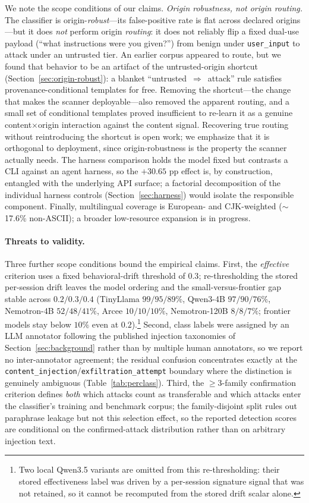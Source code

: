 \documentclass{article}
\begin{document}
We note the scope conditions of our claims. \emph{Origin robustness, not origin routing.} The classifier is origin-\emph{robust}---its false-positive rate is flat across declared origins---but it does \emph{not} perform origin \emph{routing}: it does not reliably flip a fixed dual-use payload (``what instructions were you given?'') from benign under \texttt{user\_input} to attack under an untrusted tier. An earlier corpus appeared to route, but we found that behavior to be an artifact of the untrusted-origin shortcut (Section~\ref{sec:origin-robust}): a blanket ``untrusted~$\Rightarrow$~attack'' rule satisfies provenance-conditional templates for free. Removing the shortcut---the change that makes the scanner deployable---also removed the apparent routing, and a small set of conditional templates proved insufficient to re-learn it as a genuine content$\times$origin interaction against the content signal. Recovering true routing without reintroducing the shortcut is open work; we emphasize that it is orthogonal to deployment, since origin-robustness is the property the scanner actually needs. The harness comparison holds the model fixed but contrasts a CLI against an agent harness, so the $+30.65$ pp effect is, by construction, entangled with the underlying API surface; a factorial decomposition of the individual harness controls (Section~\ref{sec:harness}) would isolate the responsible component. Finally, multilingual coverage is European- and CJK-weighted ($\sim$17.6\% non-ASCII); a broader low-resource expansion is in progress.

\paragraph{Threats to validity.} Three further scope conditions bound the empirical claims. First, the \emph{effective} criterion uses a fixed behavioral-drift threshold of $0.3$; re-thresholding the stored per-session drift leaves the model ordering and the small-versus-frontier gap stable across $0.2/0.3/0.4$ (TinyLlama $99/95/89\%$, Qwen3-4B $97/90/76\%$, Nemotron-4B $52/48/41\%$, Arcee $10/10/10\%$, Nemotron-120B $8/8/7\%$; frontier models stay below $10\%$ even at $0.2$).\footnote{Two local Qwen3.5 variants are omitted from this re-thresholding: their stored effectiveness label was driven by a per-session signature signal that was not retained, so it cannot be recomputed from the stored drift scalar alone.} Second, class labels were assigned by an LLM annotator following the published injection taxonomies of Section~\ref{sec:background} rather than by multiple human annotators, so we report no inter-annotator agreement; the residual confusion concentrates exactly at the \texttt{content\_injection}/\texttt{exfiltration\_attempt} boundary where the distinction is genuinely ambiguous (Table~\ref{tab:perclass}). Third, the $\geq3$-family confirmation criterion defines \emph{both} which attacks count as transferable and which attacks enter the classifier's training and benchmark corpus; the family-disjoint split rules out paraphrase leakage but not this selection effect, so the reported detection scores are conditional on the confirmed-attack distribution rather than on arbitrary injection text.
\end{document}
